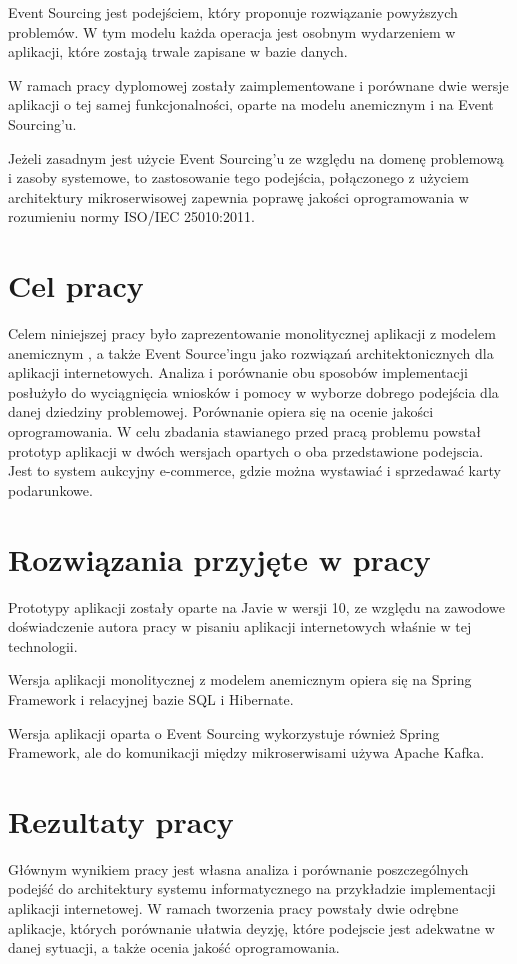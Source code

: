 Event Sourcing jest podejściem, który proponuje rozwiązanie powyższych problemów. W tym modelu każda operacja jest osobnym wydarzeniem w aplikacji, które zostają trwale zapisane w bazie danych. 

W ramach pracy dyplomowej zostały zaimplementowane i porównane dwie wersje aplikacji o tej samej funkcjonalności, oparte na modelu anemicznym i na Event Sourcing'u. 

Jeżeli zasadnym jest użycie Event Sourcing'u ze względu na domenę problemową i zasoby systemowe, to zastosowanie tego podejścia, połączonego z użyciem architektury mikroserwisowej zapewnia poprawę jakości oprogramowania w rozumieniu normy ISO/IEC 25010:2011.


\section{Cel pracy}
Celem niniejszej pracy było zaprezentowanie monolitycznej aplikacji z modelem anemicznym , a także Event Source'ingu jako rozwiązań architektonicznych dla aplikacji internetowych. Analiza i porównanie obu sposobów implementacji posłużyło do wyciągnięcia wniosków i pomocy w wyborze dobrego podejścia dla danej dziedziny problemowej.
Porównanie opiera się na ocenie jakości oprogramowania.
W celu zbadania stawianego przed pracą problemu powstał prototyp aplikacji w dwóch wersjach opartych o oba przedstawione podejscia. 
Jest to system aukcyjny e-commerce, gdzie można wystawiać i sprzedawać karty podarunkowe.

\section{Rozwiązania przyjęte w pracy}
Prototypy aplikacji zostały oparte na Javie w wersji 10, ze względu na zawodowe doświadczenie autora pracy w pisaniu aplikacji internetowych właśnie w tej technologii.

Wersja aplikacji monolitycznej z modelem anemicznym opiera się na Spring Framework i relacyjnej bazie SQL i Hibernate. 

Wersja aplikacji oparta o Event Sourcing wykorzystuje również Spring Framework, ale do komunikacji między mikroserwisami używa Apache Kafka.

\section{Rezultaty pracy}
Głównym wynikiem pracy jest własna analiza i porównanie poszczególnych podejść do architektury systemu informatycznego na przykładzie implementacji aplikacji internetowej.
W ramach tworzenia pracy powstały dwie odrębne aplikacje, których porównanie ułatwia deyzję, które podejscie jest adekwatne w danej sytuacji, a także ocenia jakość oprogramowania.

